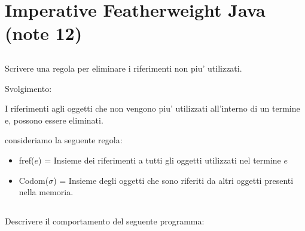 \section{Imperative Featherweight Java (note 12)}
\vspace{1cm}

\subsection*{}
Scrivere una regola per eliminare i riferimenti non piu' utilizzati.


Svolgimento:


I riferimenti agli oggetti che non vengono piu' utilizzati all'interno di un termine e, possono essere eliminati.

consideriamo la seguente regola:

\begin{prooftree}
	\end{prooftree}

\vspace{0,5cm}

\begin{itemize}
\item fref($e$) = Insieme dei riferimenti a tutti gli oggetti utilizzati nel termine $e$
\item Codom($\sigma$) = Insieme degli oggetti che sono riferiti da altri oggetti presenti nella memoria.
\end{itemize}

\vspace{1,5cm}



\subsection*{}
Descrivere il comportamento del seguente programma:

